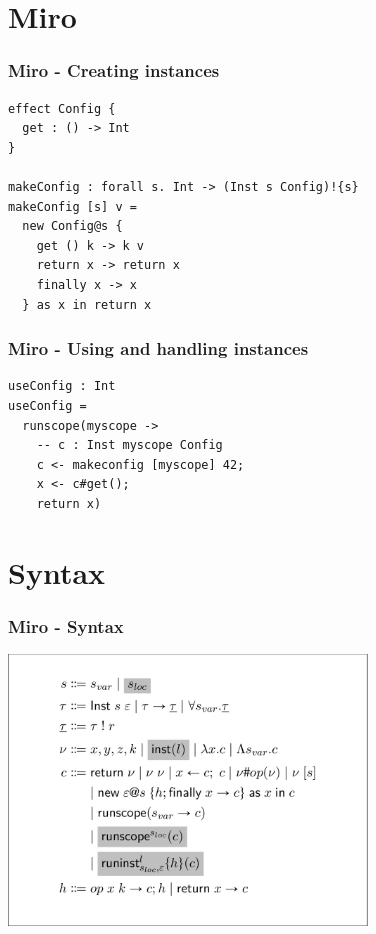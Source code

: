 \documentclass{beamer}
\begin{document}
\section{Miro}

\begin{frame}[fragile]\frametitle{Miro - Creating instances}
\begin{example}
\begin{verbatim}
effect Config {
  get : () -> Int
}

makeConfig : forall s. Int -> (Inst s Config)!{s}
makeConfig [s] v =
  new Config@s {
    get () k -> k v
    return x -> return x
    finally x -> x
  } as x in return x
\end{verbatim}
\end{example}
\end{frame}

\begin{frame}[fragile]\frametitle{Miro - Using and handling instances}
\begin{example}
\begin{verbatim}
useConfig : Int
useConfig =
  runscope(myscope ->
    -- c : Inst myscope Config
    c <- makeconfig [myscope] 42;
    x <- c#get();
    return x)
\end{verbatim}
\end{example}
\end{frame}

\section{Syntax}

\begin{frame}[fragile]\frametitle{Miro - Syntax}
\begin{center}
\includegraphics[width=270pt]{images/syntax.png}
\end{center}
\end{frame}
\end{document}

